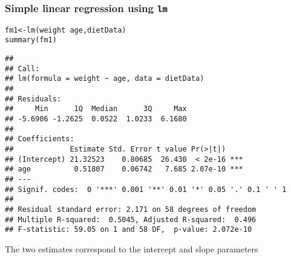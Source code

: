 \documentclass[color=usenames,dvipsnames]{beamer}\usepackage[]{graphicx}\usepackage[]{color}
\makeatletter
\newcommand{\hlopt}[1]{\textcolor[rgb]{0,0,0}{#1}}%
\newcommand{\hlstd}[1]{\textcolor[rgb]{0,0,0}{#1}}%
\newcommand{\hlkwb}[1]{\textcolor[rgb]{0,0.341,0.682}{#1}}%
\newcommand{\hlkwd}[1]{\textcolor[rgb]{0.004,0.004,0.506}{#1}}%
\newenvironment{kframe}{%
 \def\at@end@of@kframe{}%
 \ifinner\ifhmode%
  \def\at@end@of@kframe{\end{minipage}}%
  \begin{minipage}{\columnwidth}%
 \fi\fi%
 \def\FrameCommand##1{\hskip\@totalleftmargin \hskip-\fboxsep
 \colorbox{shadecolor}{##1}\hskip-\fboxsep
     \hskip-\linewidth \hskip-\@totalleftmargin \hskip\columnwidth}%
 \MakeFramed {\advance\hsize-\width
   \@totalleftmargin\z@ \linewidth\hsize
   \@setminipage}}%
 {\par\unskip\endMakeFramed%
 \at@end@of@kframe}
\newenvironment{knitrout}{}{} %
\makeatother
\begin{document}
\begin{frame}[fragile]
  \frametitle{Simple linear regression using {\tt lm}}

\begin{knitrout}\scriptsize
{}\color{fgcolor}\begin{kframe}
\begin{alltt}
\hlstd{fm1} \hlkwb{<-} \hlkwd{lm}\hlstd{(weight} \hlopt{~} \hlstd{age, dietData)}
\hlkwd{summary}\hlstd{(fm1)}
\end{alltt}
\begin{verbatim}
## 
## Call:
## lm(formula = weight ~ age, data = dietData)
## 
## Residuals:
##     Min      1Q  Median      3Q     Max 
## -5.6906 -1.2625  0.0522  1.0233  6.1680 
## 
## Coefficients:
##             Estimate Std. Error t value Pr(>|t|)    
## (Intercept) 21.32523    0.80685  26.430  < 2e-16 ***
## age          0.51807    0.06742   7.685 2.07e-10 ***
## ---
## Signif. codes:  0 '***' 0.001 '**' 0.01 '*' 0.05 '.' 0.1 ' ' 1
## 
## Residual standard error: 2.171 on 58 degrees of freedom
## Multiple R-squared:  0.5045,	Adjusted R-squared:  0.496 
## F-statistic: 59.05 on 1 and 58 DF,  p-value: 2.072e-10
\end{verbatim}
\end{kframe}
\end{knitrout}
\pause
\footnotesize
{The two estimates correspond to the intercept and slope parameters}
\end{frame}
\end{document}
